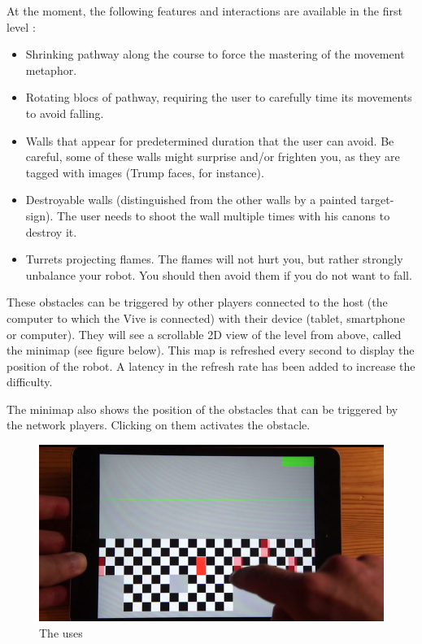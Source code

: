 \documentclass[12pt]{article}
\begin{document}
At the moment, the following features and interactions are available in the first level :

\begin{itemize}
	\item Shrinking pathway along the course to force the mastering of the movement metaphor.
	\item Rotating blocs of pathway, requiring the user to carefully time its movements to avoid falling.
	\item Walls that appear for predetermined duration that the user can avoid. Be careful, some of these walls might surprise and/or frighten you, as they are tagged with images (Trump faces, for instance).
	\item Destroyable walls (distinguished from the other walls by a painted target-sign). The user needs to shoot the wall multiple times with his canons to destroy it.
	\item Turrets projecting flames. The flames will not hurt you, but rather strongly unbalance your robot. You should then avoid them if you do not want to fall.
\end{itemize}

These obstacles can be triggered by other players connected to the host (the computer to which the Vive is connected) with their device (tablet, smartphone or computer). They will see a scrollable 2D view of the level from above, called the minimap (see figure below). This map is refreshed every second to display the position of the robot. A latency in the refresh rate has been added to increase the difficulty.

The minimap also shows the position of the obstacles that can be triggered by the network players. Clicking on them activates the obstacle.

\begin{figure}[h]
   \caption{\label{étiquette} The uses}
   \includegraphics[scale=1]{images/minimap.png}
\end{figure}
\end{document}
